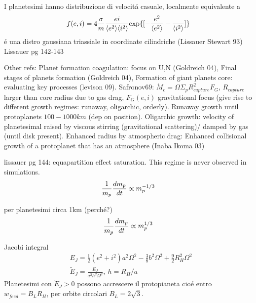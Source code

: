 \begin{workout}
I planetesimi hanno distribuzione di velocit\'a casuale, localmente equivalente a
\begin{equation}
f(e,i)=4\frac{\sigma}{m}\frac{ei}{\exv{e^2}\exv{i^2}}\Exp{[-\frac{e^2}{\exv{e^2}}-\frac{}{\exv{i^2}}]}
\end{equation}
\'e una distro gaussiana triassiale in coordinate cilindriche (Lissauer Stewart 93)
Lissauer pg 142-143
\end{workout}

\begin{workout}
Other refs: Planet formation coagulation: focus on U,N (Goldreich 04), Final stages of planets formation (Goldreich 04), Formation of giant planets core: evaluating key processes (levison 09).
Safronov69: $\dot{M}_c=\Omega\Sigma_pR^2_{capture}F_G$, $R_{capture}$ larger than core radius due to gas drag, $F_G(e,i)$ gravitational focus (give rise to different growth regimes: runaway, oligarchic, orderly).
Runaway growth until protoplanets $100-1000km$ (dep on position).
Oligarchic growth: velocity of planetesimal raised by viscous stirring (gravitational scattering)/ damped by gas (until disk present).
Enhanced radius by atmospheric drag: Enhanced collisional growth of a protoplanet that has an atmosphere (Inaba Ikoma 03)
\end{workout}

\begin{workout}
lissauer pg 144: equapartition effect saturation. This regime is never observed in simulations.
\begin{equation}
\frac{1}{m_p}\TDy{t}{m_p}\propto m_p\expy{-1/3}
\end{equation}
\end{workout}

\begin{workout}
per planetesimi circa 1km (perch\'e?)
\begin{equation}
\frac{1}{m_p}\TDy{t}{m_p}\propto m_p\expy{1/3}
\end{equation}
\end{workout}

\begin{workout}
Jacobi integral
\begin{align}
&E_J=\frac{1}{2}(e^2+i^2)a^2\Omega^2-\frac{3}{8}b^2\Omega^2+\frac{9}{2}R_H^2\Omega^2\\
&\tilde{E}_J=\frac{E_J}{a^2h^2\Omega^2},\ h=R_H/a
\end{align}
Planetesimi con $\tilde{E}_J>0$ possono accrescere il protopianeta  cio\'e entro $w_{feed}=B_LR_H$, per orbite circolari $B_L=2\sqrt{3 }$.
\end{workout}


